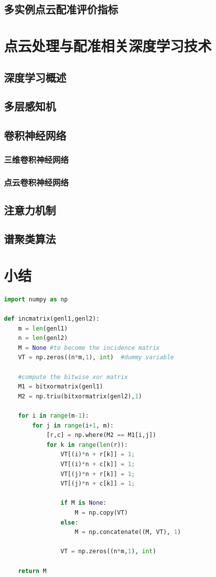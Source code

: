 \subsection{多实例点云配准评价指标}

\section{点云处理与配准相关深度学习技术}
\subsection{深度学习概述}
\subsection{多层感知机}
\subsection{卷积神经网络}
\subsubsection{三维卷积神经网络}
\subsubsection{点云卷积神经网络}
\subsection{注意力机制}
\subsection{谱聚类算法}

\section{小结}

\begin{lstlisting}[language=Python, caption={Python Code}, label={lst:pythonfile}]
import numpy as np

def incmatrix(genl1,genl2):
    m = len(genl1)
    n = len(genl2)
    M = None #to become the incidence matrix
    VT = np.zeros((n*m,1), int)  #dummy variable

    #compute the bitwise xor matrix
    M1 = bitxormatrix(genl1)
    M2 = np.triu(bitxormatrix(genl2),1)

    for i in range(m-1):
        for j in range(i+1, m):
            [r,c] = np.where(M2 == M1[i,j])
            for k in range(len(r)):
                VT[(i)*n + r[k]] = 1;
                VT[(i)*n + c[k]] = 1;
                VT[(j)*n + r[k]] = 1;
                VT[(j)*n + c[k]] = 1;

                if M is None:
                    M = np.copy(VT)
                else:
                    M = np.concatenate((M, VT), 1)

                VT = np.zeros((n*m,1), int)

    return M
\end{lstlisting}
